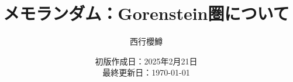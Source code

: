 \newcommand{\CATEGORY}{メモランダム}%
\newcommand{\TITLE}{Gorenstein圏について}
\newcommand{\AUTHORNAME}{西行櫻鱒}
\newcommand{\CREATEDAT}{2025年2月21日}

\title{\CATEGORY：\TITLE}
\author{\AUTHORNAME}
\date{初版作成日：\CREATEDAT\\最終更新日：\today}

